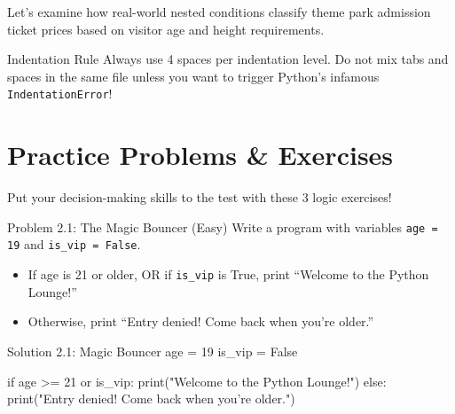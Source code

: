 Let's examine how real-world nested conditions classify theme park admission ticket prices based on visitor age and height requirements.


\begin{snakesnack}{Indentation Rule}
Always use 4 spaces per indentation level. Do not mix tabs and spaces in the same file unless you want to trigger Python's infamous \texttt{IndentationError}!
\end{snakesnack}

\section{Practice Problems \& Exercises}

Put your decision-making skills to the test with these 3 logic exercises!

\begin{snakelab}{Problem 2.1: The Magic Bouncer (Easy)}
Write a program with variables \texttt{age = 19} and \texttt{is\_vip = False}.
\begin{itemize}
    \item If age is 21 or older, OR if \texttt{is\_vip} is True, print ``Welcome to the Python Lounge!''
    \item Otherwise, print ``Entry denied! Come back when you're older.''
\end{itemize}
\end{snakelab}

\begin{pycode}{Solution 2.1: Magic Bouncer}
age = 19
is_vip = False

if age >= 21 or is_vip:
    print("Welcome to the Python Lounge!")
else:
    print("Entry denied! Come back when you're older.")
\end{pycode}

